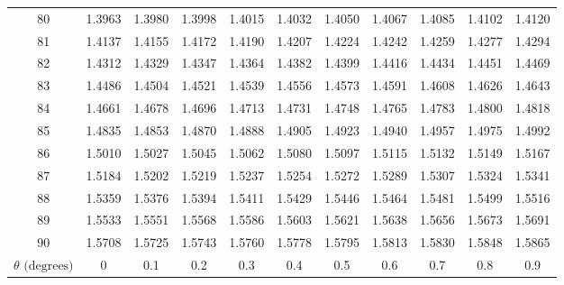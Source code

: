 {\begin{tabular}{|c|cccccccccc|}
\hline
80 & 1.3963 & 1.3980 & 1.3998 & 1.4015 & 1.4032 & 1.4050 & 1.4067 & 1.4085 & 1.4102 & 1.4120 \\
81 & 1.4137 & 1.4155 & 1.4172 & 1.4190 & 1.4207 & 1.4224 & 1.4242 & 1.4259 & 1.4277 & 1.4294 \\
82 & 1.4312 & 1.4329 & 1.4347 & 1.4364 & 1.4382 & 1.4399 & 1.4416 & 1.4434 & 1.4451 & 1.4469 \\
83 & 1.4486 & 1.4504 & 1.4521 & 1.4539 & 1.4556 & 1.4573 & 1.4591 & 1.4608 & 1.4626 & 1.4643 \\
84 & 1.4661 & 1.4678 & 1.4696 & 1.4713 & 1.4731 & 1.4748 & 1.4765 & 1.4783 & 1.4800 & 1.4818 \\
\hline
85 & 1.4835 & 1.4853 & 1.4870 & 1.4888 & 1.4905 & 1.4923 & 1.4940 & 1.4957 & 1.4975 & 1.4992 \\
86 & 1.5010 & 1.5027 & 1.5045 & 1.5062 & 1.5080 & 1.5097 & 1.5115 & 1.5132 & 1.5149 & 1.5167 \\
87 & 1.5184 & 1.5202 & 1.5219 & 1.5237 & 1.5254 & 1.5272 & 1.5289 & 1.5307 & 1.5324 & 1.5341 \\
88 & 1.5359 & 1.5376 & 1.5394 & 1.5411 & 1.5429 & 1.5446 & 1.5464 & 1.5481 & 1.5499 & 1.5516 \\
89 & 1.5533 & 1.5551 & 1.5568 & 1.5586 & 1.5603 & 1.5621 & 1.5638 & 1.5656 & 1.5673 & 1.5691 \\
\hline
90 & 1.5708 & 1.5725 & 1.5743 & 1.5760 & 1.5778 & 1.5795 & 1.5813 & 1.5830 & 1.5848 & 1.5865 \\
\hline
$\theta\text{ (degrees)}$ & 0 & 0.1 & 0.2 & 0.3 & 0.4 & 0.5 & 0.6 & 0.7 & 0.8 & 0.9 \\ \hline
\end{tabular}\par}
